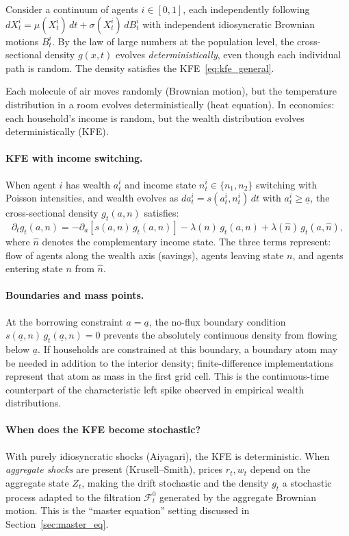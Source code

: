 \documentclass[11pt,a4paper]{report}
\begin{document}
Consider a continuum of agents $i \in [0,1]$, each independently following $dX_t^i = \mu(X_t^i)\,dt + \sigma(X_t^i)\,dB_t^i$ with independent idiosyncratic Brownian motions $B_t^i$.  By the law of large numbers at the population level, the cross-sectional density $g(x,t)$ evolves \emph{deterministically}, even though each individual path is random.  The density satisfies the KFE~\eqref{eq:kfe_general}.

\begin{remarkbox}
Each molecule of air moves randomly (Brownian motion), but the temperature distribution in a room evolves deterministically (heat equation).  In economics: each household's income is random, but the wealth distribution evolves deterministically (KFE).
\end{remarkbox}

\paragraph{KFE with income switching.}  When agent $i$ has wealth $a_t^i$ and income state $n_t^i \in \{n_1, n_2\}$ switching with Poisson intensities, and wealth evolves as $da_t^i = s(a_t^i, n_t^i)\,dt$ with $a_t^i \geq \underline{a}$, the cross-sectional density $g_t(a,n)$ satisfies:
\begin{equation}
\partial_t g_t(a,n) = -\partial_a\!\left[s(a,n)\,g_t(a,n)\right] - \lambda(n)\,g_t(a,n) + \lambda(\hat{n})\,g_t(a,\hat{n}),
\label{eq:kfe_econ}
\end{equation}
where $\hat{n}$ denotes the complementary income state.  The three terms represent: flow of agents along the wealth axis (savings), agents leaving state $n$, and agents entering state $n$ from $\hat{n}$.

\paragraph{Boundaries and mass points.}  At the borrowing constraint $a = \underline{a}$, the no-flux boundary condition $s(\underline{a},n)\,g_t(\underline{a},n) = 0$ prevents the absolutely continuous density from flowing below $\underline{a}$.  If households are constrained at this boundary, a boundary atom may be needed in addition to the interior density; finite-difference implementations represent that atom as mass in the first grid cell.  This is the continuous-time counterpart of the characteristic left spike observed in empirical wealth distributions.

\paragraph{When does the KFE become stochastic?}  With purely idiosyncratic shocks (Aiyagari), the KFE is deterministic.  When \emph{aggregate shocks} are present (Krusell--Smith), prices $r_t, w_t$ depend on the aggregate state $Z_t$, making the drift stochastic and the density $g_t$ a stochastic process adapted to the filtration $\mathcal{F}_t^0$ generated by the aggregate Brownian motion.  This is the ``master equation'' setting discussed in Section~\ref{sec:master_eq}.
\end{document}
